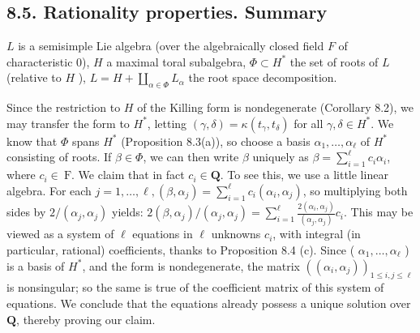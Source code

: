 \documentclass[10pt]{article}
\begin{document}
\subsection*{8.5. Rationality properties. Summary}
$L$ is a semisimple Lie algebra (over the algebraically closed field $F$ of characteristic 0), $H$ a maximal toral subalgebra, $\Phi \subset H^{*}$ the set of roots of $L$ (relative to $H$ ), $L=H+\coprod_{\alpha \in \Phi} L_{\alpha}$ the root space decomposition.

Since the restriction to $H$ of the Killing form is nondegenerate (Corollary 8.2), we may transfer the form to $H^{*}$, letting $(\gamma, \delta)=\kappa\left(t_{\gamma}, t_{\delta}\right)$ for all $\gamma, \delta \in H^{*}$. We know that $\Phi$ spans $H^{*}$ (Proposition 8.3(a)), so choose a basis $\alpha_{1}, \ldots, \alpha_{\ell}$ of $H^{*}$ consisting of roots. If $\beta \in \Phi$, we can then write $\beta$ uniquely as $\beta=\sum_{i=1}^{\ell} c_{i} \alpha_{i}$, where $c_{i} \in \mathrm{~F}$. We claim that in fact $c_{i} \in \mathbf{Q}$. To see this, we use a little linear algebra. For each $j=1, \ldots, \ell,\left(\beta, \alpha_{j}\right)=\sum_{i=1}^{\ell} c_{i}\left(\alpha_{i}, \alpha_{j}\right)$, so multiplying both sides by $2 /\left(\alpha_{j}, \alpha_{j}\right)$ yields: $2\left(\beta, \alpha_{j}\right) /\left(\alpha_{j}, \alpha_{j}\right)=\sum_{i=1}^{\ell} \frac{2\left(\alpha_{i}, \alpha_{j}\right)}{\left(\alpha_{j}, \alpha_{j}\right)} c_{i}$. This may be viewed as a system of $\ell$ equations in $\ell$ unknowns $c_{i}$, with integral (in particular, rational) coefficients, thanks to Proposition 8.4 (c). Since ( $\alpha_{1}, \ldots, \alpha_{\ell}$ ) is a basis of $H^{*}$, and the form is nondegenerate, the matrix $\left(\left(\alpha_{i}, \alpha_{j}\right)\right)_{1 \leq i, j \leq \ell}$ is nonsingular; so the same is true of the coefficient matrix of this system of\\
equations. We conclude that the equations already possess a unique solution over $\mathbf{Q}$, thereby proving our claim.
\end{document}
